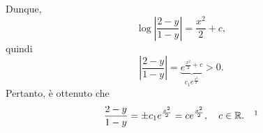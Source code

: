 \begin{example}
\begin{enumerate}
    Dunque,
    \begin{equation*}
        \log\left|\frac{2-y}{1-y}\right| = \frac{x^2}{2}+c,
    \end{equation*}
    quindi
    \begin{equation*}
        \left|\frac{2-y}{1-y}\right| = \underbrace{e^{\frac{x^2}{2}+ c}}_{c_1e^{\frac{x^2}{2}}}>0.
    \end{equation*}
    Pertanto, è ottenuto che 
    \begin{equation}\label{eq:soluzioni_generali_esercizio_edo}
        \frac{2-y}{1-y}=\pm c_1 e^{\frac{x^2}{2}}=c e^{\frac{x^2}{2}},\quad c\in\mathbb R. \quad\footnotemark
    \end{equation}
    

\end{enumerate}
\end{example}
